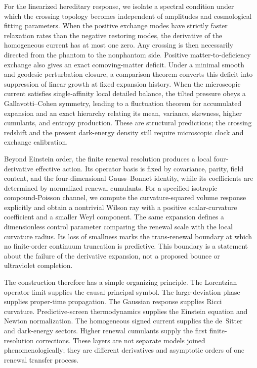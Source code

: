 \documentclass[11pt]{article}
\theoremstyle{definition}
\theoremstyle{remark}
\begin{document}
For the linearized hereditary response, we isolate a spectral condition under which the crossing topology becomes independent of amplitudes and cosmological fitting parameters.  When the positive exchange modes have strictly faster relaxation rates than the negative restoring modes, the derivative of the homogeneous current has at most one zero.  Any crossing is then necessarily directed from the phantom to the nonphantom side.  Positive matter-to-deficiency exchange also gives an exact comoving-matter deficit.  Under a minimal smooth and geodesic perturbation closure, a comparison theorem converts this deficit into suppression of linear growth at fixed expansion history.  When the microscopic current satisfies single-affinity local detailed balance, the tilted pressure obeys a Gallavotti--Cohen symmetry, leading to a fluctuation theorem for accumulated expansion and an exact hierarchy relating its mean, variance, skewness, higher cumulants, and entropy production.  These are structural predictions; the crossing redshift and the present dark-energy density still require microscopic clock and exchange calibration.

Beyond Einstein order, the finite renewal resolution produces a local four-derivative effective action.  Its operator basis is fixed by covariance, parity, field content, and the four-dimensional Gauss--Bonnet identity, while its coefficients are determined by normalized renewal cumulants.  For a specified isotropic compound-Poisson channel, we compute the curvature-squared volume response explicitly and obtain a nontrivial Wilson ray with a positive scalar-curvature coefficient and a smaller Weyl component.  The same expansion defines a dimensionless control parameter comparing the renewal scale with the local curvature radius.  Its loss of smallness marks the trans-renewal boundary at which no finite-order continuum truncation is predictive.  This boundary is a statement about the failure of the derivative expansion, not a proposed bounce or ultraviolet completion.

The construction therefore has a simple organizing principle.  The Lorentzian operator limit supplies the causal principal symbol.  The large-deviation phase supplies proper-time propagation.  The Gaussian response supplies Ricci curvature.  Predictive-screen thermodynamics supplies the Einstein equation and Newton normalization.  The homogeneous signed current supplies the de~Sitter and dark-energy sectors.  Higher renewal cumulants supply the first finite-resolution corrections.  These layers are not separate models joined phenomenologically; they are different derivatives and asymptotic orders of one renewal transfer process.
\end{document}
